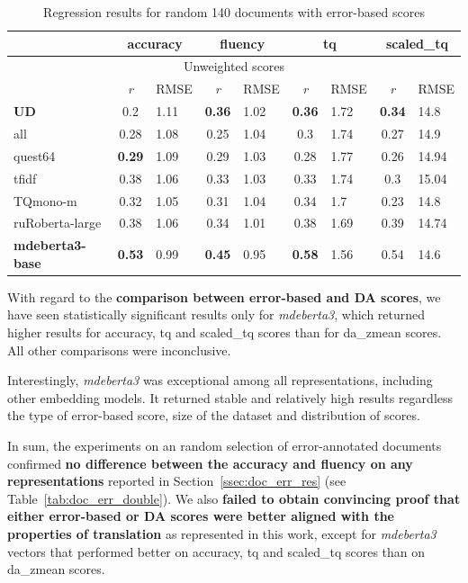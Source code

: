 \begin{table}[H]
	\centering
	\begin{tabular}{l|cl|cl|cl|cl}
		\toprule
		& \multicolumn{2}{c|}{accuracy} & \multicolumn{2}{c|}{fluency}  & \multicolumn{2}{c|}{tq} & \multicolumn{2}{c}{scaled\_tq}    \\
		\midrule
		\multicolumn{9}{c}{Unweighted scores} \\
		\midrule
		& \textit{r}        & RMSE & \textit{r}       & RMSE & \textit{r}    & RMSE & \textit{r}    & RMSE  \\
		\midrule
		\textbf{UD}              & 0.2  & 1.11 & \textbf{0.36} & 1.02 & \textbf{0.36} & 1.72 & \textbf{0.34} & 14.8  \\
		all             & 0.28 & 1.08 & 0.25 & 1.04 & 0.3  & 1.74 & 0.27 & 14.9  \\
		quest64         & \textbf{0.29} & 1.09 & 0.29 & 1.03 & 0.28 & 1.77 & 0.26 & 14.94 \\
		\midrule
		tfidf           & 0.38 & 1.06 & 0.33 & 1.03 & 0.33 & 1.74 & 0.3  & 15.04 \\
		\midrule
		TQmono-m        & 0.32 & 1.05 & 0.31 & 1.04 & 0.34 & 1.7  & 0.23 & 14.8  \\
		ruRoberta-large & 0.38 & 1.06 & 0.34 & 1.01 & 0.38 & 1.69 & 0.39 & 14.74 \\
		\textbf{mdeberta3-base}  & \textbf{0.53} & 0.99 &\textbf{0.45} & 0.95 & \textbf{0.58} & 1.56 & 0.54 & 14.6 \\
		\bottomrule
	\end{tabular}
	\caption{\label{tab:err140rand_res}Regression results for random 140 documents with error-based scores}
\end{table}

With regard to the \textbf{comparison between error-based and DA scores}, we have seen statistically significant results only for \textit{mdeberta3}, which returned higher results for accuracy, tq and scaled\_tq scores than for da\_zmean scores. 
All other comparisons were inconclusive. 


Interestingly, \textit{mdeberta3} was exceptional among all representations, including other embedding models. It returned stable and relatively high results regardless the type of error-based score, size of the dataset and distribution of scores. 

In sum, the experiments on an random selection of error-annotated documents confirmed \textbf{no difference between the accuracy and fluency on any representations} reported in Section~\ref{ssec:doc_err_res} (see Table~\ref{tab:doc_err_double}). 
We also \textbf{failed to obtain convincing proof that either error-based or DA scores were better aligned with the properties of translation} as represented in this work, except for \textit{mdeberta3} vectors that performed better on accuracy, tq and scaled\_tq scores than on da\_zmean scores. 

